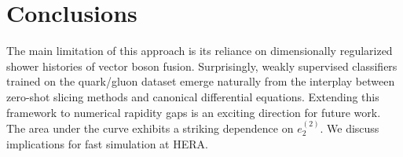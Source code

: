 \section{Conclusions}\label{sec:conclusions}

The main limitation of this approach is its reliance on dimensionally
regularized shower histories of vector boson fusion. Surprisingly,
weakly supervised classifiers trained on the quark/gluon dataset emerge
naturally from the interplay between zero-shot slicing methods and
canonical differential equations. Extending this framework to numerical
rapidity gaps is an exciting direction for future work. The area under
the curve exhibits a striking dependence on $e_2^{(2)}$. We discuss
implications for fast simulation at HERA.

